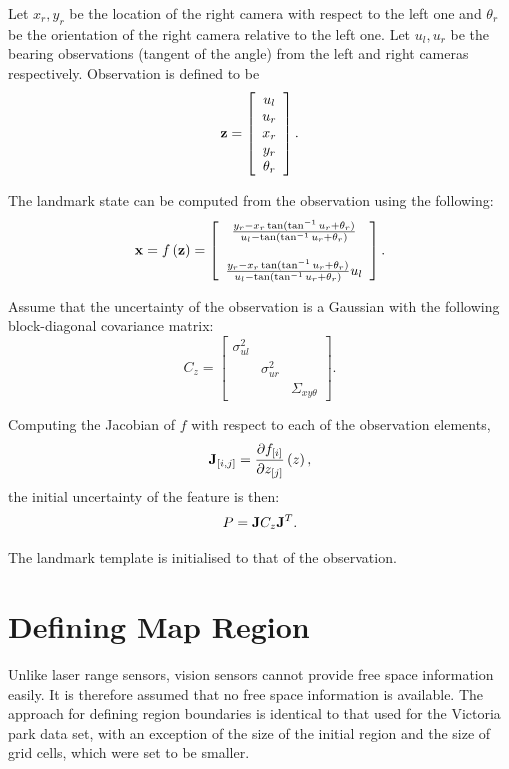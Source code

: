 Let $x_r,y_r$ be the location of the right camera with respect to the
left one and $\theta_r$ be the orientation of the right camera
relative to the left one. Let $u_l,u_r$ be the bearing observations
(tangent of the angle) from the left and right cameras
respectively. Observation is defined to be
$$
{\bf z} =  \left[
    \begin{array}{c}
       u_l\\u_r\\x_r\\y_r\\\theta_r
    \end{array}
\right].
$$

The landmark state can be computed from the observation using the
following:
$$
{\bf x} = f\left({\bf z}\right) 
= \left[\begin{array}{c}
\frac{y_r - x_r\tan(\tan^{-1} u_r+\theta_r)}{u_l-\tan(\tan^{-1} u_r+\theta_r) }\\
{}\\
\frac{y_r - x_r\tan(\tan^{-1} u_r+\theta_r)}{u_l-\tan(\tan^{-1} u_r+\theta_r)}u_l
\end{array}
\right].
$$

Assume that the uncertainty of the observation is a Gaussian with
the following block-diagonal covariance matrix:
$$
C_z = \left[
  \begin{array}{ccc}
    \sigma^2_{ul} &             & \\
                & \sigma^2_{ur} & \\
                &             & \Sigma_{xy\theta}
  \end{array}
\right].
$$

Computing the Jacobian of $f$ with respect to each of the
observation elements,
$$
{\bf J}_{[i,j]} = \frac{\partial f_{[i]}}
{\partial z_{[j]}}\left(z \right),
$$
the initial uncertainty of the feature is then:
$$
P = {\bf J} C_z {\bf J}^T.
$$

The landmark template is initialised to that of the observation.

\section{Defining Map Region}

Unlike laser range sensors, vision sensors cannot provide free space
information easily. It is therefore assumed that no free space
information is available. The approach for defining region boundaries
is identical to that used for the Victoria park data set, with an
exception of the size of the initial region and the size of grid
cells, which were set to be smaller.

